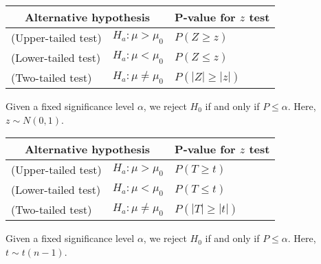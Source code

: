 \documentclass[t,handout]{beamer}
\begin{document}
\begin{frame}
    \begin{center}
        \renewcommand*{\arraystretch}{1.1}
        \begin{tabular}{ll|l}
            \multicolumn{2}{c}{Alternative hypothesis} & P-value for $z$ test                    \\ \hline
            (Upper-tailed test)                        & $H_a: \mu>\mu_0$     & $P(Z\geq z)$     \\
            (Lower-tailed test)                        & $H_a: \mu<\mu_0$     & $P(Z\leq z)$     \\
            (Two-tailed test)                          & $H_a: \mu\neq\mu_0$  & $P(|Z|\geq |z|)$ \\
        \end{tabular}
    \end{center}
    Given a fixed significance level $\alpha$, we reject $H_0$ if  and only if $P\leq \alpha$. Here, $z\sim N(0,1)$.

    \begin{center}
        \renewcommand*{\arraystretch}{1.1}
        \begin{tabular}{ll|l}
            \multicolumn{2}{c}{Alternative hypothesis} & P-value for $z$ test                    \\ \hline
            (Upper-tailed test)                        & $H_a: \mu>\mu_0$     & $P(T\geq t)$     \\
            (Lower-tailed test)                        & $H_a: \mu<\mu_0$     & $P(T\leq t)$     \\
            (Two-tailed test)                          & $H_a: \mu\neq\mu_0$  & $P(|T|\geq |t|)$ \\
        \end{tabular}
    \end{center}

    Given a fixed significance level $\alpha$, we reject $H_0$ if  and only if $P\leq \alpha$. Here, $t\sim t(n-1)$.

\end{frame}
\end{document}
